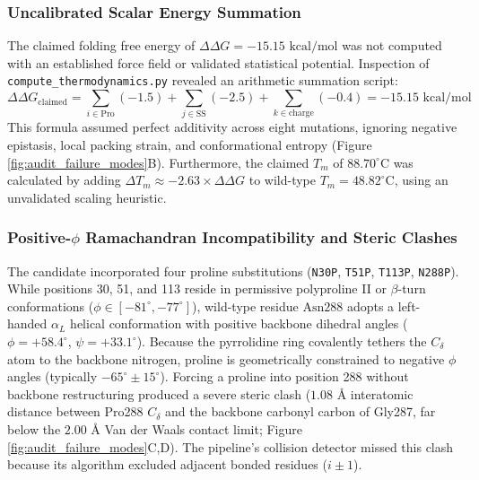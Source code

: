 \documentclass[11pt,a4paper]{article}
\begin{document}
\subsubsection{Uncalibrated Scalar Energy Summation}
The claimed folding free energy of $\Delta\Delta G = -15.15\text{ kcal/mol}$ was not computed with an established force field or validated statistical potential. Inspection of \texttt{compute\_thermodynamics.py} revealed an arithmetic summation script:
\begin{equation}
    \Delta\Delta G_{\text{claimed}} = \sum_{i \in \text{Pro}} (-1.5) + \sum_{j \in \text{SS}} (-2.5) + \sum_{k \in \text{charge}} (-0.4) = -15.15\text{ kcal/mol}
\end{equation}
This formula assumed perfect additivity across eight mutations, ignoring negative epistasis, local packing strain, and conformational entropy (Figure \ref{fig:audit_failure_modes}B). Furthermore, the claimed $T_m$ of $88.70^\circ\text{C}$ was calculated by adding $\Delta T_m \approx -2.63 \times \Delta\Delta G$ to wild-type $T_m = 48.82^\circ\text{C}$, using an unvalidated scaling heuristic.

\subsubsection{Positive-$\phi$ Ramachandran Incompatibility and Steric Clashes}
The candidate incorporated four proline substitutions (\texttt{N30P}, \texttt{T51P}, \texttt{T113P}, \texttt{N288P}). While positions 30, 51, and 113 reside in permissive polyproline II or $\beta$-turn conformations ($\phi \in [-81^\circ, -77^\circ]$), wild-type residue $\text{Asn288}$ adopts a left-handed $\alpha_L$ helical conformation with positive backbone dihedral angles ($\phi = +58.4^\circ$, $\psi = +33.1^\circ$). Because the pyrrolidine ring covalently tethers the $C_\delta$ atom to the backbone nitrogen, proline is geometrically constrained to negative $\phi$ angles (typically $-65^\circ \pm 15^\circ$). Forcing a proline into position 288 without backbone restructuring produced a severe steric clash ($1.08\text{ \AA}$ interatomic distance between Pro288 $C_\delta$ and the backbone carbonyl carbon of Gly287, far below the $2.00\text{ \AA}$ Van der Waals contact limit; Figure \ref{fig:audit_failure_modes}C,D). The pipeline's collision detector missed this clash because its algorithm excluded adjacent bonded residues ($i \pm 1$).
\end{document}
